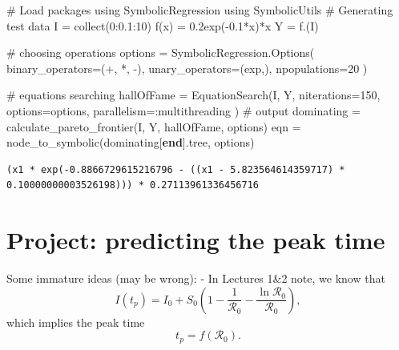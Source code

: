 \documentclass[
  letterpaper,
  DIV=11,
  numbers=noendperiod]{scrreport}
\newenvironment{Shaded}{\begin{snugshade}}{\end{snugshade}}
\newcommand{\BuiltInTok}[1]{\textcolor[rgb]{0.00,0.23,0.31}{#1}}
\newcommand{\CommentTok}[1]{\textcolor[rgb]{0.37,0.37,0.37}{#1}}
\newcommand{\FloatTok}[1]{\textcolor[rgb]{0.68,0.00,0.00}{#1}}
\newcommand{\FunctionTok}[1]{\textcolor[rgb]{0.28,0.35,0.67}{#1}}
\newcommand{\ImportTok}[1]{\textcolor[rgb]{0.00,0.46,0.62}{#1}}
\newcommand{\KeywordTok}[1]{\textcolor[rgb]{0.00,0.23,0.31}{\textbf{#1}}}
\newcommand{\NormalTok}[1]{\textcolor[rgb]{0.00,0.23,0.31}{#1}}
\newcommand{\OperatorTok}[1]{\textcolor[rgb]{0.37,0.37,0.37}{#1}}
\begin{document}
\begin{Shaded}
\begin{Highlighting}[]
\CommentTok{\# Load packages}
\ImportTok{using} \BuiltInTok{SymbolicRegression}
\ImportTok{using} \BuiltInTok{SymbolicUtils}
\CommentTok{\# Generating test data}
\NormalTok{I }\OperatorTok{=} \FunctionTok{collect}\NormalTok{(}\FloatTok{0}\OperatorTok{:}\FloatTok{0.1}\OperatorTok{:}\FloatTok{10}\NormalTok{)}
\FunctionTok{f}\NormalTok{(x) }\OperatorTok{=} \FloatTok{0.2}\FunctionTok{exp}\NormalTok{(}\OperatorTok{{-}}\FloatTok{0.1}\OperatorTok{*}\NormalTok{x)}\OperatorTok{*}\NormalTok{x}
\NormalTok{Y }\OperatorTok{=} \FunctionTok{f}\NormalTok{.(I)}


\CommentTok{\# choosing operations}
\NormalTok{options }\OperatorTok{=}\NormalTok{ SymbolicRegression.}\FunctionTok{Options}\NormalTok{(}
\NormalTok{    binary\_operators}\OperatorTok{=}\NormalTok{(}\OperatorTok{+}\NormalTok{, }\OperatorTok{*}\NormalTok{, }\OperatorTok{{-}}\NormalTok{),}
\NormalTok{    unary\_operators}\OperatorTok{=}\NormalTok{(exp,),}
\NormalTok{    npopulations}\OperatorTok{=}\FloatTok{20}
\NormalTok{)}


\CommentTok{\# equations searching}
\NormalTok{hallOfFame }\OperatorTok{=} \FunctionTok{EquationSearch}\NormalTok{(I}\OperatorTok{\textquotesingle{}}\NormalTok{, Y, niterations}\OperatorTok{=}\FloatTok{150}\NormalTok{, options}\OperatorTok{=}\NormalTok{options, parallelism}\OperatorTok{=:}\NormalTok{multithreading}
\NormalTok{)}
\CommentTok{\# output}
\NormalTok{dominating }\OperatorTok{=} \FunctionTok{calculate\_pareto\_frontier}\NormalTok{(I, Y, hallOfFame, options)}
\NormalTok{eqn }\OperatorTok{=} \FunctionTok{node\_to\_symbolic}\NormalTok{(dominating[}\KeywordTok{end}\NormalTok{].tree, options)}
\end{Highlighting}
\end{Shaded}

\begin{verbatim}
(x1 * exp(-0.8866729615216796 - ((x1 - 5.823564614359717) * 0.10000000003526198))) * 0.27113961336456716
\end{verbatim}

\section{Project: predicting the peak
time}\label{project-predicting-the-peak-time}

Some immature ideas (may be wrong): - In Lectures 1\&2 note, we know
that
\[I(t_p)=I_0+S_0\left(1-\frac{1}{\mathcal{R}_0}-\frac{\ln\mathcal{R}_0}{\mathcal{R}_0}\right),\]
which implies the peak time \[t_p=f(\mathcal{R}_0).\]
\end{document}
